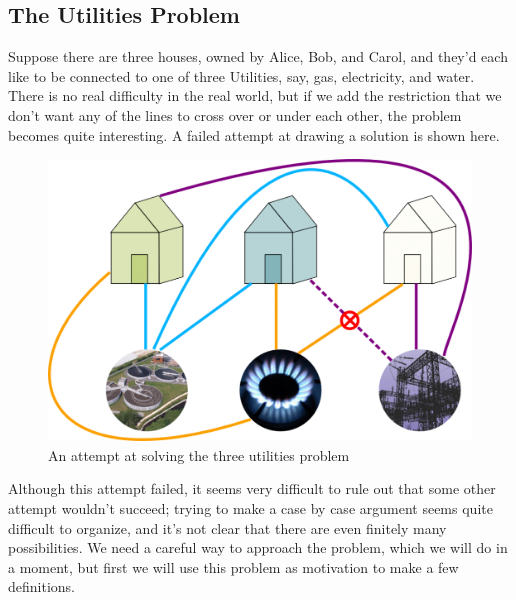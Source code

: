 \documentclass[10pt,]{book}
\theoremstyle{plain}
\theoremstyle{definition}
\theoremstyle{definition}
\theoremstyle{definition}
\theoremstyle{definition}
\numberwithin{equation}{section}
\begin{document}
\subsection[{The Utilities Problem}]{The Utilities Problem}\label{subsection-26}
\hypertarget{p-275}{}%
Suppose there are three houses, owned by Alice, Bob, and Carol, and they'd each like to be connected to one of three Utilities, say, gas, electricity, and water.  There is no real difficulty in the real world, but if we add the restriction that we don't want any of the lines to cross over or under each other, the problem becomes quite interesting.  A failed attempt at drawing a solution is shown here.%
\begin{figure}
\centering
\includegraphics[width=0.7\linewidth]{images/The-Utilities-Problem-Bad-Solution.png}
\caption{An attempt at solving the three utilities problem\label{failed_utilities}}
\end{figure}
\hypertarget{p-276}{}%
Although this attempt failed, it seems very difficult to rule out that some other attempt wouldn't succeed; trying to make a case by case argument seems quite difficult to organize, and it's not clear that there are even finitely many possibilities.  We need a careful way to approach the problem, which we will do in a moment, but first we will use this problem as motivation to make a few definitions.%
\typeout{************************************************}
\typeout{************************************************}
\end{document}
